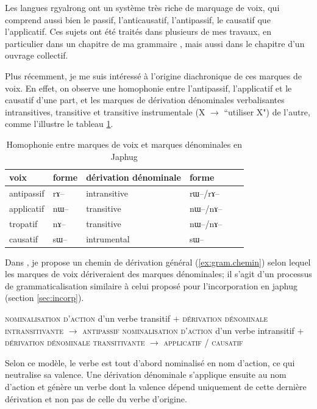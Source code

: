 \documentclass[oldfontcommands,oneside,a4paper,11pt]{memoir}
\newcommand{\ipa}[1]{{\phon #1}} %
\begin{document}
Les langues rgyalrong ont un système très riche de marquage de voix, qui comprend aussi bien le passif, l'anticausatif, l'antipassif, le causatif que l'applicatif. Ces sujets ont été traités dans plusieurs de mes travaux, en particulier dans un chapitre de ma grammaire \citet{jacques08zh}, mais aussi dans le chapitre \citet{jacques12demotion} d'un ouvrage collectif. 


Plus récemment, je me suis intéressé à l'origine diachronique de ces marques de voix. En effet, on observe une homophonie entre l'antipassif, l'applicatif et le causatif d'une part, et les marques de dérivation dénominales verbalisantes intransitives, transitive et transitive instrumentale (X $\rightarrow$ ``utiliser X") de l'autre, comme l'illustre le tableau \ref{tab:homophonie}.


\begin{table}[H]
\caption{Homophonie entre marques de voix et marques dénominales en Japhug } \label{tab:homophonie} \centering
\begin{tabular}{llllll}
\toprule
voix& forme&dérivation dénominale& forme \\
\midrule
  antipassif&\ipa{rɤ}--&intransitive&\ipa{rɯ}--/\ipa{rɤ}--   \\
 applicatif&\ipa{nɯ}--&transitive&\ipa{nɯ}--/\ipa{nɤ}--   \\
 tropatif&\ipa{nɤ}--&transitive&\ipa{nɯ}--/\ipa{nɤ}--   \\
 causatif&\ipa{sɯ}--&intrumental&\ipa{sɯ}--    \\
\bottomrule
\end{tabular}
\end{table}

Dans \citet{jacques14antipassive}, je propose un chemin de dérivation général (\ref{ex:gram.chemin}) selon lequel les marques de voix dériveraient des marques dénominales; il s'agit d'un processus de grammaticalisation similaire à celui proposé pour l'incorporation en japhug (section \ref{sec:incorp}).


\begin{exe}
\ex \label{ex:gram.chemin}
\glt \textsc{nominalisation d'action} d'un verbe transitif + \textsc{dérivation dénominale intransitivante} $\rightarrow$ \textsc{antipassif}
\glt \textsc{nominalisation d'action} d'un verbe intransitif  + \textsc{dérivation dénominale  transitivante} $\rightarrow$ \textsc{applicatif} / \textsc{causatif}
\end{exe}


Selon ce modèle, le verbe est tout d'abord nominalisé en nom d'action, ce qui neutralise  sa valence. Une dérivation dénominale  s'applique ensuite au nom d'action et génère un verbe dont la valence dépend uniquement de cette dernière dérivation et non pas de celle du verbe d'origine. 
\end{document}
